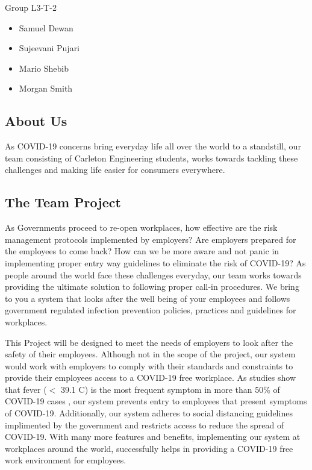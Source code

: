 Group L3-T-2
\begin{itemize}
    \item Samuel Dewan
    \item Sujeevani Pujari 
    \item Mario Shebib 
    \item Morgan Smith
\end{itemize}

\subsection{About Us}

As COVID-19 concerns bring everyday life all over the world to a standstill, our
team consisting of Carleton Engineering students, works towards tackling these
challenges and making life easier for consumers everywhere.

\subsection{The Team Project} 

As Governments proceed to re-open workplaces, how effective are the risk
management protocols implemented by employers? Are employers prepared for the
employees to come back? How can we be more aware and not panic in implementing
proper entry way guidelines to eliminate the risk of COVID-19? As people
around the world face these challenges everyday, our team works towards
providing the ultimate solution to following proper call-in procedures. We bring
to you a system that looks after the well being of your employees and follows
government regulated infection prevention policies, practices and guidelines for
workplaces. 

This Project will be designed to meet the needs of employers to look after the
safety of their employees. Although not in the scope of the project, our system 
would work with employers to comply with their standards and constraints to 
provide their employees access to a COVID-19 free workplace. As studies 
show that fever ($<$ 39.1 \textdegree C) is the most frequent symptom in more 
than 50\% of COVID-19 cases \cite{Michelen_2020}, our system prevents entry 
to employees that present symptoms of COVID-19. Additionally, our system 
adheres to social distancing guidelines implimented by the government and
restricts access to reduce the spread of COVID-19. With many more features and
benefits, implementing our system at workplaces around the world, successfully
helps in providing a COVID-19 free work environment for employees. 

